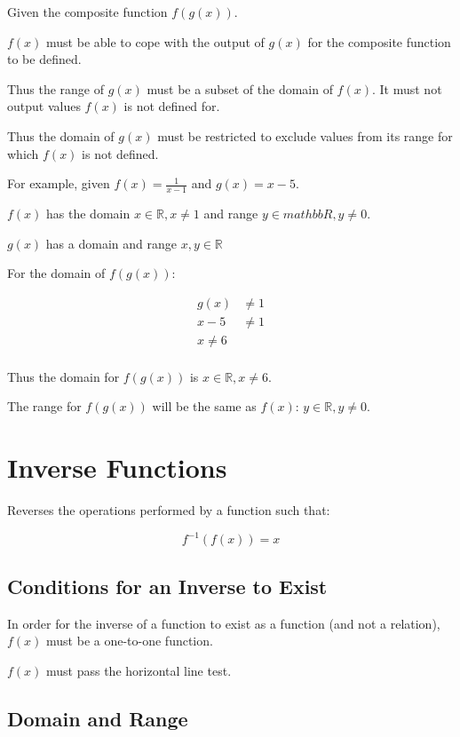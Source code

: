\documentclass[a4paper,11pt]{article}
\begin{document}
Given the composite function $f(g(x))$.

$f(x)$ must be able to cope with the output of $g(x)$ for the composite
function to be defined.

Thus the range of $g(x)$ must be a subset of the domain of $f(x)$. It must not
output values $f(x)$ is not defined for.

Thus the domain of $g(x)$ must be restricted to exclude values from its range
for which $f(x)$ is not defined.

For example, given $f(x) = \frac{1}{x - 1}$ and $g(x) = x - 5$.

$f(x)$ has the domain $x \in \mathbb{R}, x \neq 1$ and range
$y \in mathbb{R}, y \neq 0$.

$g(x)$ has a domain and range $x, y \in \mathbb{R}$

For the domain of $f(g(x))$:

$$
\begin{aligned}
g(x) & \neq 1 \\
x - 5 & \neq 1 \\
x \neq 6 \\
\end{aligned}
$$

Thus the domain for $f(g(x))$ is $x \in \mathbb{R}, x \neq 6$.

The range for $f(g(x))$ will be the same as $f(x)$:
$y \in \mathbb{R}, y \neq 0$.




\section{Inverse Functions}

Reverses the operations performed by a function such that:

$$
f^{-1}(f(x)) = x
$$


\subsection{Conditions for an Inverse to Exist}

In order for the inverse of a function to exist as a function (and not a
relation), $f(x)$ must be a one-to-one function.

$f(x)$ must pass the horizontal line test.


\subsection{Domain and Range}
\end{document}
